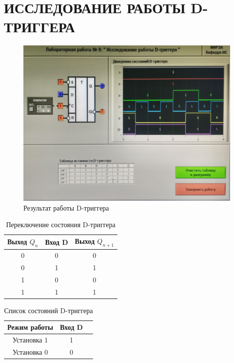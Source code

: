 \section{ИССЛЕДОВАНИЕ РАБОТЫ D-ТРИГГЕРА}

\begin{figure}[H]
	\centering
	\includegraphics[width=0.95\linewidth]{imgs/9/1}
	\caption{Результат работы D-триггера}
	\label{fig:9_1}
\end{figure}

\begin{table}[H]
	\centering
	\caption{Переключение состояния D-триггера}
	\label{tab:lab_09_states}
	\begin{tabular}{|c|c|c|}
		\hline
		Выход $Q_n$ & Вход D & Выход $Q_{n+1}$ \\ \hline
		0           & 0      & 0               \\ \hline
		0           & 1      & 1               \\ \hline
		1           & 0      & 0               \\ \hline
		1           & 1      & 1               \\ \hline
	\end{tabular}
\end{table}

\begin{table}[H]
	\centering
	\caption{Список состояний D-триггера}
	\label{tab:lab_09_mode}
	\begin{tabular}{|c|c|c|}
		\hline
		Режим работы        & Вход D \\ \hline
		Установка 1         & 1      \\ \hline
		Установка 0         & 0      \\ \hline
	\end{tabular}
\end{table}

